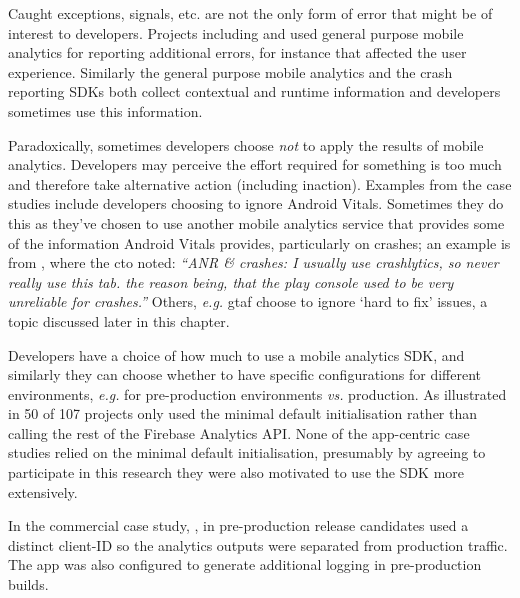 
Caught exceptions, signals, etc. are not the only form of error that might be of interest to developers. Projects including  and  used general purpose mobile analytics for reporting additional errors, for instance that affected the user experience. Similarly the general purpose mobile analytics and the crash reporting SDKs both collect contextual and runtime information and developers sometimes use this information.

 Paradoxically, sometimes developers choose \emph{not} to apply the results of mobile analytics. Developers may perceive the effort required for something is too much and therefore take alternative action (including inaction). Examples from the case studies include developers choosing to ignore Android Vitals. Sometimes they do this as they've chosen to use another mobile analytics service that provides some of the information Android Vitals provides, particularly on crashes; an example is from , where the \Gls{cto} noted: \emph{``ANR \& crashes: I usually use crashlytics, so never really use this tab. the reason being, that the play console used to be very unreliable for crashes.''} Others, \emph{e.g.} \Gls{gtaf} choose to ignore `hard to fix' issues, a topic discussed later in this chapter.

Developers have a choice of how much to use a mobile analytics SDK, and similarly they can choose whether to have specific configurations for different environments, \emph{e.g.} for pre-production environments \emph{vs.} production. As illustrated in  50 of 107 projects only used the minimal default initialisation rather than calling the rest of the Firebase Analytics API. None of the app-centric case studies relied on the minimal default initialisation, presumably by agreeing to participate in this research they were also motivated to use the SDK more extensively. 

In the commercial case study, , in pre-production release candidates used a distinct client-ID so the analytics outputs were separated from production traffic. The app was also configured to generate additional logging in pre-production builds.

